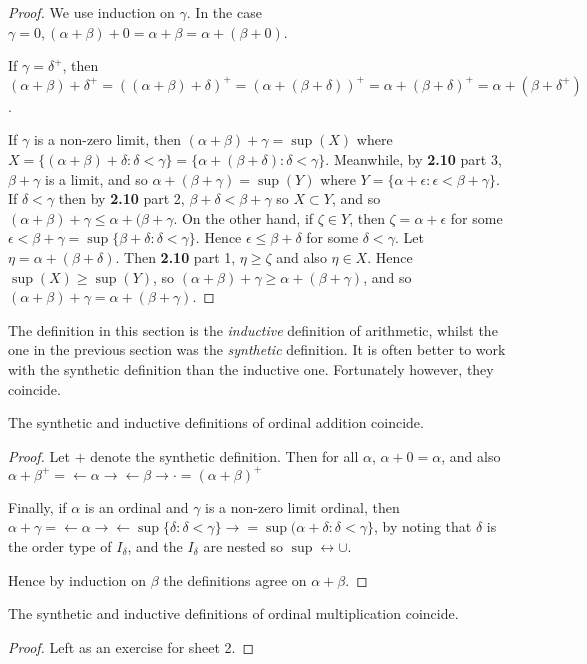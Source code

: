 \documentclass[10pt,a4paper]{article}
\begin{document}
\begin{proof}
We use induction on $\gamma$. In the case $\gamma = 0, (\alpha + \beta) + 0 = \alpha + \beta = \alpha + (\beta + 0)$.

If $\gamma = \delta^+$, then $(\alpha + \beta) + \delta^+ = ((\alpha+\beta) + \delta)^+ = (\alpha + (\beta + \delta))^+ = \alpha + (\beta+\delta)^+ = \alpha + (\beta+ \delta^+)$.


If $\gamma$ is a non-zero limit, then $(\alpha + \beta) + \gamma = \sup(X)$ where $X = \{(\alpha+\beta)+\delta : \delta < \gamma\} = \{\alpha + (\beta+\delta) : \delta < \gamma\}$. Meanwhile, by \textbf{2.10} part 3, $\beta + \gamma$ is a limit, and so $\alpha + (\beta+ \gamma) = \sup(Y)$ where $Y = \{\alpha + \epsilon : \epsilon < \beta + \gamma\}$. If $\delta < \gamma$ then by \textbf{2.10} part 2, $\beta+ \delta < \beta + \gamma$ so $X \subset Y$, and so $(\alpha + \beta) + \gamma \leq \alpha + (\beta+\gamma$. On the other hand, if $\zeta \in Y$, then $\zeta = \alpha + \epsilon$ for some $\epsilon < \beta + \gamma = \sup\{\beta + \delta : \delta  < \gamma\}$. Hence $\epsilon \leq \beta + \delta$ for some $\delta < \gamma$. Let $\eta = \alpha + (\beta + \delta)$. Then \textbf{2.10} part 1, $\eta \geq \zeta$ and also $\eta \in X$. Hence $\sup(X) \geq \sup(Y)$, so $(\alpha + \beta) + \gamma \geq \alpha + (\beta+\gamma)$, and so $(\alpha+\beta)+\gamma = \alpha +(\beta+\gamma)$.
\end{proof}

The definition in this section is the \emph{inductive} definition of arithmetic, whilst the one in the previous section was the \emph{synthetic} definition. It is often better to work with the synthetic definition than the inductive one. Fortunately however, they coincide.

\begin{proposition}
The synthetic and inductive definitions of ordinal addition coincide.
\end{proposition}
\begin{proof}
Let $+$ denote the synthetic definition. Then for all $\alpha$, $\alpha + 0 = \alpha$, and also $\alpha+\beta^+ = \leftarrow \alpha \rightarrow \leftarrow \beta \rightarrow \cdot = (\alpha+\beta)^+$

Finally, if $\alpha$ is an ordinal and $\gamma$ is a non-zero limit ordinal, then $\alpha + \gamma = \leftarrow \alpha \rightarrow \leftarrow \sup\{\delta:\delta<\gamma\}\rightarrow = \sup(\alpha+\delta: \delta <\gamma\}$, by noting that $\delta$ is the order type of $I_{\delta}$, and the $I_{\delta}$ are nested so $\sup \leftrightarrow \cup$.

Hence by induction on $\beta$ the definitions agree on $\alpha + \beta$.
\end{proof}
\begin{proposition}
The synthetic and inductive definitions of ordinal multiplication coincide.
\end{proposition}
\begin{proof}
Left as an exercise for sheet 2.
\end{proof}
\end{document}
